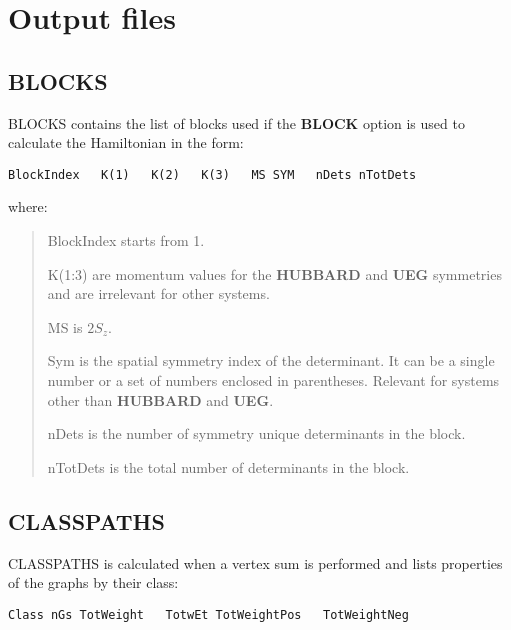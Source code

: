 \documentclass[openany,a4paper,10pt]{manual}
\begin{document}
\resetcurrentobjects


\hypertarget{output-index}{}\chapter{Output files}

\resetcurrentobjects


\hypertarget{output-blocks}{}\section{BLOCKS}

BLOCKS contains the list of blocks used if the \textbf{BLOCK} option is used to
calculate the Hamiltonian in the form:

\begin{Verbatim}[commandchars=@\[\]]
BlockIndex   K(1)   K(2)   K(3)   MS SYM   nDets nTotDets
\end{Verbatim}

where:
\begin{quote}

BlockIndex starts from 1.

K(1:3) are momentum values for the \textbf{HUBBARD} and \textbf{UEG} symmetries and
are irrelevant for other systems.

MS is $2S_z$.

Sym is the spatial symmetry index of the determinant.  It can be a single
number or a set of numbers enclosed in parentheses.  Relevant for systems
other than \textbf{HUBBARD} and \textbf{UEG}.

nDets is the number of symmetry unique determinants in the block.

nTotDets is the total number of determinants in the block.
\end{quote}

\resetcurrentobjects


\hypertarget{output-classpaths}{}\section{CLASSPATHS}

CLASSPATHS is calculated when a vertex sum is performed and lists properties of the graphs by their class:

\begin{Verbatim}[commandchars=@\[\]]
Class nGs TotWeight   TotwEt TotWeightPos   TotWeightNeg
\end{Verbatim}
\end{document}
